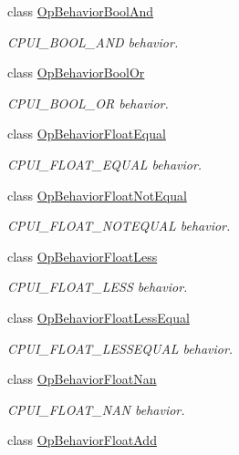 \begin{DoxyCompactItemize}
class \mbox{\hyperlink{class_op_behavior_bool_and}{Op\+Behavior\+Bool\+And}}
\begin{DoxyCompactList}\small\item\em C\+P\+U\+I\+\_\+\+B\+O\+O\+L\+\_\+\+A\+ND behavior. \end{DoxyCompactList}\item 
class \mbox{\hyperlink{class_op_behavior_bool_or}{Op\+Behavior\+Bool\+Or}}
\begin{DoxyCompactList}\small\item\em C\+P\+U\+I\+\_\+\+B\+O\+O\+L\+\_\+\+OR behavior. \end{DoxyCompactList}\item 
class \mbox{\hyperlink{class_op_behavior_float_equal}{Op\+Behavior\+Float\+Equal}}
\begin{DoxyCompactList}\small\item\em C\+P\+U\+I\+\_\+\+F\+L\+O\+A\+T\+\_\+\+E\+Q\+U\+AL behavior. \end{DoxyCompactList}\item 
class \mbox{\hyperlink{class_op_behavior_float_not_equal}{Op\+Behavior\+Float\+Not\+Equal}}
\begin{DoxyCompactList}\small\item\em C\+P\+U\+I\+\_\+\+F\+L\+O\+A\+T\+\_\+\+N\+O\+T\+E\+Q\+U\+AL behavior. \end{DoxyCompactList}\item 
class \mbox{\hyperlink{class_op_behavior_float_less}{Op\+Behavior\+Float\+Less}}
\begin{DoxyCompactList}\small\item\em C\+P\+U\+I\+\_\+\+F\+L\+O\+A\+T\+\_\+\+L\+E\+SS behavior. \end{DoxyCompactList}\item 
class \mbox{\hyperlink{class_op_behavior_float_less_equal}{Op\+Behavior\+Float\+Less\+Equal}}
\begin{DoxyCompactList}\small\item\em C\+P\+U\+I\+\_\+\+F\+L\+O\+A\+T\+\_\+\+L\+E\+S\+S\+E\+Q\+U\+AL behavior. \end{DoxyCompactList}\item 
class \mbox{\hyperlink{class_op_behavior_float_nan}{Op\+Behavior\+Float\+Nan}}
\begin{DoxyCompactList}\small\item\em C\+P\+U\+I\+\_\+\+F\+L\+O\+A\+T\+\_\+\+N\+AN behavior. \end{DoxyCompactList}\item 
class \mbox{\hyperlink{class_op_behavior_float_add}{Op\+Behavior\+Float\+Add}}

\end{DoxyCompactItemize}
